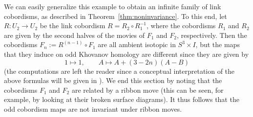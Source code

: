 \documentclass[12pt]{amsart}
\theoremstyle{definition}
\theoremstyle{plain}
\begin{document}
We can easily generalize this example to obtain an infinite family of link cobordisms, as described in
Theorem~\ref{thm:noninvariance}. To this end, let $R\colon U_2\rightarrow U_2$ be the link cobordism
$R=R_2\circ R_1^{-1}$, where the cobordisms $R_1$ and $R_2$ are given by the second halves of the movies of $F_1$
and $F_2$, respectively. Then the cobordisms $F_{n}:=R^{(n-1)}\circ F_1$ are all ambient isotopic in $S^3\times I$, but
the maps that they induce on odd Khovanov homology are different since they are given by
\[1 \mapsto 1,\qquad A\mapsto A+ (3-2n)(A-B)\]
(the computations are left the reader since a conceptual interpretation of the above formulas will be given in \cite{MW2024b}).
We end this section by noting that the cobordisms $F_1$ and $F_2$ are related by a ribbon move
(this can be seen, for example, by looking at their broken surface diagrams). It thus follows that the odd cobordism
maps are not invariant under ribbon moves.

\printbibliography
\end{document}
